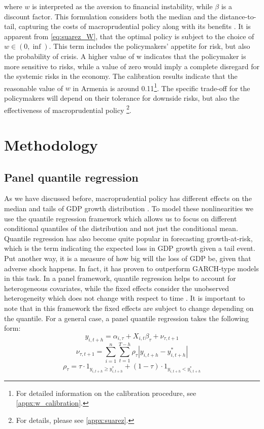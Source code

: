 \documentclass[12pt,a4paper]{article}
\begin{document}
where $w$ is interpreted as the aversion to financial instability, while $\beta$ is a discount factor. This formulation considers both the median and the distance-to-tail, capturing the costs of macroprudential policy along with its benefits \citep{cecchetti_2021}. It is apparent from \autoref{eq:suarez_W}, that the optimal policy is subject to the choice of $w\in(0,\inf)$. This term includes the policymakers' appetite for risk, but also the probability of crisis. A higher value of w indicates that the policymaker is more sensitive to risks, while a value of zero would imply a complete disregard for the systemic risks in the economy. The calibration results indicate that the reasonable value of $w$ in Armenia is around 0.11\footnote{For detailed information on the calibration procedure, see \ref{appx:w_calibration}.}. The specific trade-off for the policymakers will depend on their tolerance for downside risks, but also the effectiveness of macroprudential policy \citep{esrb2021, suarez2022} \footnote{For details, please see \ref{appx:suarez}.}.



\section{Methodology}
\subsection{Panel quantile regression}
As we have discussed before, macroprudential policy has different effects on the median and tails of GDP growth distribution \citep{boar_2017}. To model these nonlinearities we use the quantile regression framework \citep{koenker_1978_regression} which allows us to focus on different conditional quantiles of the distribution and not just the conditional mean. Quantile regression has also become quite popular in forecasting growth-at-risk, which is the term indicating the expected loss in GDP growth given a tail event. Put another way, it is a measure of how big will the loss of GDP be, given that adverse shock happens. In fact, it has proven to outperform GARCH-type models \citep{kipriyanov_2022} in this task. In a panel framework, quantile regression helps to account for heterogeneous covariates, while the fixed effects consider the unobserved heterogeneity which does not change with respect to time \citep{galan2020}. It is important to note that in this framework the fixed effects are subject to change depending on the quantile. For a general case, a panel quantile regression takes the following form:
\begin{equation}
    \label{eq:panel_qr}
    y_{i,t+h} = \alpha_{i, \tau} + X_{i,t} \beta_\tau + \nu_{\tau,t+1}
\end{equation}
\begin{equation}
    \label{eq:panel_qr_loss}
    \nu_{\tau,t+1} = \sum_{i=1}^n \sum_{t=1}^{T-h}\rho_\tau| y_{i,t+h} -  y_{i,t+h}^*|
\end{equation}
\begin{equation}
    \label{eq:panel_qr_weights}
    \rho_\tau = \tau \cdot 1_{y_{i,t+h} \geq y_{i,t+h}^*} + (1-\tau) \cdot 1_{y_{i,t+h} < y_{i,t+h}^*}
\end{equation}
\end{document}
